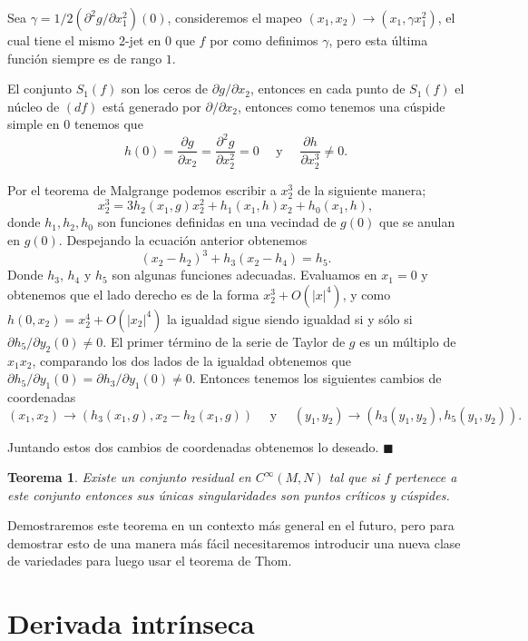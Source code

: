 \documentclass{report}
\newtheorem{theorem}{Teorema}[section]
\theoremstyle{definition}
\begin{document}
Sea $\gamma = 1 / 2 (\partial^2    g /\partial x_1^2 )(0)$, consideremos el mapeo $(x_1 , x_2 ) \to (x_1, \gamma x_1^2)$, el cual tiene el mismo 2-jet en $0$ que $f$ por como definimos $\gamma$, pero esta \'ultima funci\'on siempre es de rango $1$.

El conjunto $S_1(f)$ son los ceros de $\partial g / \partial x_2$, entonces en cada punto de $S_1 (f)$ el n\'ucleo de $(df)$ est\'a generado por $\partial / \partial x_2$, entonces como tenemos una c\'uspide simple en $0$ tenemos que
$$h(0)=\frac{\partial g}{\partial x_2} = \frac{\partial^2 g}{\partial x_2^2} = 0 \quad \text{ y } \quad \frac{\partial h}{\partial x_2^3} \neq 0 .$$

Por el teorema de Malgrange podemos escribir a $x_2^3$ de la siguiente manera;
$$x_2^3 = 3 h_2(x_1, g) x_2^2 + h_1 (x_1, h) x_2 + h_0(x_1,h) ,$$
donde $h_1, h_2, h_0$ son funciones definidas en una vecindad de $g(0)$ que se anulan en $g(0)$. Despejando la ecuaci\'on anterior obtenemos 
$$(x_2 - h_2)^3 + h_3(x_2 - h_4) = h_5 .$$
Donde $h_3$, $h_4$ y $h_5$ son algunas funciones adecuadas. Evaluamos en $x_1 = 0$ y obtenemos que el lado derecho es de la forma $x_2^3 + O(\vert x \vert^4)$, y como $h(0,x_2) =x_2^4 + O ( \vert x_2 \vert^4)$ la igualdad sigue siendo igualdad si y s\'olo si $\partial h_5 / \partial y_2 (0) \neq 0$. El primer t\'ermino de la serie de Taylor de $g$ es un m\'ultiplo de $x_1 x_2$, comparando los dos lados de la igualdad obtenemos que $\partial h_5 / \partial y_1 (0) = \partial h_3 / \partial y_1(0) \neq 0$. Entonces tenemos los siguientes cambios de coordenadas $$(x_1 ,x_2 ) \to (h_3 (x_1, g) , x_2 - h_2(x_1, g)) \quad \text{ y } \quad (y_1 , y_2 ) \to (h_3(y_1 , y_2) , h_5(y_1,y_2)).$$

Juntando estos dos cambios de coordenadas obtenemos lo deseado. $\blacksquare$

\begin{theorem}
Existe un conjunto residual en $C^\infty (M,N)$ tal que si $f$ pertenece a este conjunto entonces sus \'unicas singularidades son puntos cr\'iticos y c\'uspides.
\end{theorem}
Demostraremos este teorema en un contexto m\'as general en el futuro, pero para demostrar esto de una manera m\'as f\'acil necesitaremos introducir una nueva clase de variedades para luego usar el teorema de Thom.

\section{Derivada intr\'inseca} 
\end{document}
